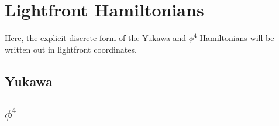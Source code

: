 \section{Lightfront Hamiltonians}
\label{subsec:lightfront-hamiltonian}
Here, the explicit discrete form of the Yukawa and $\phi^4$ Hamiltonians will be written out in lightfront coordinates. 

\subsection{Yukawa}

\subsection{$\phi^4$}
